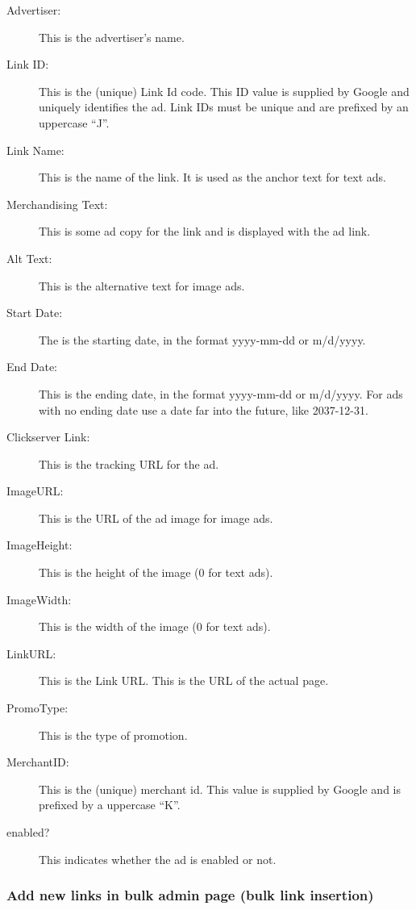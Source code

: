 \documentclass[letterpaper]{article}
\begin{document}
\begin{description}
  \item[Advertiser:] This is the advertiser's name.
  \item[Link ID:] This is the (unique) Link Id code. This ID value is
supplied by Google and uniquely identifies the ad.  Link IDs must be
unique and are prefixed by an uppercase ``J''.
  \item[Link Name:] This is the name of the link.  It is used as the
anchor text for text ads.
  \item[Merchandising Text:] This is some ad copy for the
link and is displayed with the ad link.
  \item[Alt Text:] This is the alternative text for image
ads.
  \item[Start Date:] The is the starting date, in the format yyyy-mm-dd
or m/d/yyyy. 
  \item[End Date:] This is the ending date, in the format yyyy-mm-dd or
m/d/yyyy. For ads with no ending date use a date far into the future,
like 2037-12-31.
  \item[Clickserver Link:] This is the tracking URL for the ad. 
  \item[ImageURL:] This is the URL of the ad image for image ads. 
  \item[ImageHeight:] This is the height of the image (0 for text ads). 
  \item[ImageWidth:] This is the width of the image (0 for text ads). 
  \item[LinkURL:] This is the Link URL.  This is the URL of the actual
page.
  \item[PromoType:] This is the type of promotion.
  \item[MerchantID:] This is the (unique) merchant id.  This value is
supplied by Google and is prefixed by a uppercase ``K''.
  \item[enabled?] This indicates whether the ad is enabled or
not. 
\end{description}

\subsubsection{Add new links in bulk admin page (bulk link insertion)}
\label{sect:addbulklinks}
\end{document}
